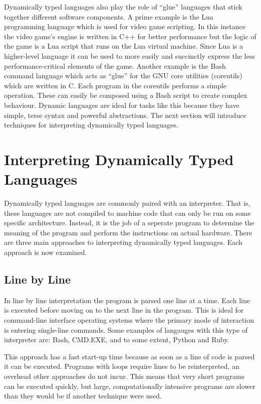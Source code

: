 \documentclass[english,a4paper,12pt]{report}
\begin{document}
Dynamically typed languages also play the role of ``glue'' languages
that stick together different software components. A prime example is
the Lua programming language which is used for video game
scripting. In this instance the video game's engine is written in C++
for better performance but the logic of the game is a Lua script that
runs on the Lua virtual machine. Since Lua is a higher-level language
it can be used to more easily and succinctly express the less
performance-critical elements of the game. Another example is the Bash
command language which acts as ``glue'' for the GNU core utilities
(coreutils) which are written in C. Each program in the coreutils
performs a simple operation. These can easily be composed using a Bash
script to create complex behaviour. Dynamic languages are ideal for
tasks like this because they have simple, terse syntax and powerful
abstractions. The next section will introduce techniques for
interpreting dynamically typed languages.

\section{Interpreting Dynamically Typed Languages}
\label{sec:interptypes}
Dynamically typed languages are commonly paired with an
interpreter. That is, these languages are not compiled to machine code
that can only be run on some specific architecture. Instead, it is the
job of a seperate program to determine the meaning of the program and
perform the instructions on actual hardware. There are three main
approaches to interpreting dynamically typed languages. Each approach
is now examined.

\subsection{Line by Line}
In line by line interpretation the program is parsed one line at a
time. Each line is executed before moving on to the next line in the
program. This is ideal for command-line interface operating systems
where the primary mode of interaction is entering single-line
commands. Some examples of langauges with this type of interpreter
are: Bash, CMD.EXE, and to some extent, Python and Ruby.

This approach has a fast start-up time because as soon as a line of
code is parsed it can be executed. Programs with loops require lines
to be reinterpreted, an overhead other approaches do not incur. This
means that very short programs can be executed quickly, but large,
computationally intensive programs are slower than they would be if
another technique were used.
\end{document}
